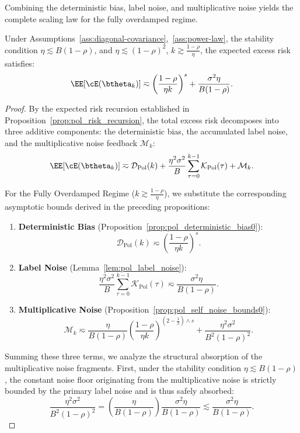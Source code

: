 Combining the deterministic bias, label noise, and multiplicative noise yields the complete scaling law for the fully overdamped regime.

\begin{theorem}
\label{thm:pol_scaling_sgd}
Under Assumptions~\ref{ass:diagonal-covariance},~\ref{ass:power-law}, the stability condition $\eta \lesssim B(1-\rho)$, and $\eta\lesssim(1-\rho)^2$, $k\gtrsim \frac{1-\rho}{\eta}$, the expected excess risk satisfies:
\[
    \EE[\cE(\btheta_k)]
    \eqsim
    \left(\frac{1-\rho}{\eta k}\right)^s
    +
    \frac{\sigma^2\eta}{B(1-\rho)}.
\]
\end{theorem}

\begin{proof}
By the expected risk recursion established in Proposition~\ref{prop:pol_risk_recursion}, the total excess risk decomposes into three additive components: the deterministic bias, the accumulated label noise, and the multiplicative noise feedback $\mathcal{M}_k$:
\[
    \EE[\cE(\btheta_k)]
    \eqsim
    \mathcal{D}_{\mathrm{Pol}}(k)
    +
    \frac{\eta^2\sigma^2}{B}\sum_{\tau=0}^{k-1}\mathcal{K}_{\mathrm{Pol}}(\tau)
    +
    \mathcal M_k.
\]

For the Fully Overdamped Regime ($k \gtrsim \frac{1-\rho}{\eta}$), we substitute the corresponding asymptotic bounds derived in the preceding propositions:
\begin{enumerate}
    \item \textbf{Deterministic Bias} (Proposition~\ref{prop:pol_deterministic_bias0}):
    \[
        \mathcal{D}_{\mathrm{Pol}}(k) \eqsim \left(\frac{1-\rho}{\eta k}\right)^s.
    \]
    \item \textbf{Label Noise} (Lemma~\ref{lem:pol_label_noise}):
    \[
        \frac{\eta^2\sigma^2}{B}\sum_{\tau=0}^{k-1}\mathcal{K}_{\mathrm{Pol}}(\tau) \eqsim \frac{\sigma^2\eta}{B(1-\rho)}.
    \]
    \item \textbf{Multiplicative Noise} (Proposition~\ref{prop:pol_self_noise_bounds0}):
    \[
        \mathcal M_k \eqsim \frac{\eta}{B(1-\rho)} \left(\frac{1-\rho}{\eta k}\right)^{\left(2-\frac1\beta\right)\wedge s} + \frac{\eta^2\sigma^2}{B^2(1-\rho)^2}.
    \]
\end{enumerate}

Summing these three terms, we analyze the structural absorption of the multiplicative noise fragments. First, under the stability condition $\eta \lesssim B(1-\rho)$, the constant noise floor originating from the multiplicative noise is strictly bounded by the primary label noise and is thus safely absorbed:
\[
    \frac{\eta^2\sigma^2}{B^2(1-\rho)^2} = \left(\frac{\eta}{B(1-\rho)}\right) \frac{\sigma^2\eta}{B(1-\rho)} \lesssim \frac{\sigma^2\eta}{B(1-\rho)}.
\]


\end{proof}
